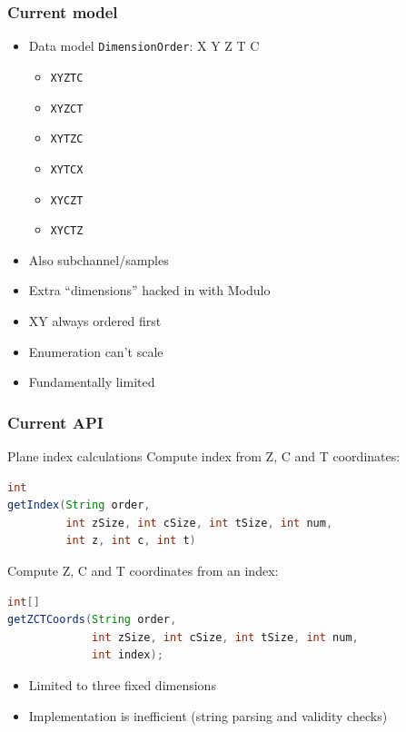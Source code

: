 \documentclass{beamer}
\begin{document}
\begin{frame}
  \frametitle{Current model}
  \begin{itemize}
  \item Data model \texttt{DimensionOrder}: X Y Z T C
    \begin{itemize}
      \item \texttt{XYZTC}
      \item \texttt{XYZCT}
      \item \texttt{XYTZC}
      \item \texttt{XYTCX}
      \item \texttt{XYCZT}
      \item \texttt{XYCTZ}
    \end{itemize}
    \pause
  \item Also subchannel/samples
  \item Extra ``dimensions'' hacked in with Modulo
  \item XY always ordered first
  \item Enumeration can't scale
  \item Fundamentally limited
  \end{itemize}
\end{frame}

\begin{frame}[fragile]
  \frametitle{Current API}
  \begin{block}{Plane index calculations}
    Compute index from Z, C and T coordinates:
  \begin{lstlisting}[language=Java]
int
getIndex(String order,
         int zSize, int cSize, int tSize, int num,
         int z, int c, int t)
  \end{lstlisting}
  Compute Z, C and T coordinates from an index:
  \begin{lstlisting}[language=Java]
int[]
getZCTCoords(String order,
             int zSize, int cSize, int tSize, int num,
             int index);
  \end{lstlisting}
  \begin{itemize}
  \item Limited to three fixed dimensions
  \item Implementation is inefficient (string parsing and validity checks)
  \end{itemize}
  \end{block}
\end{frame}
\end{document}

